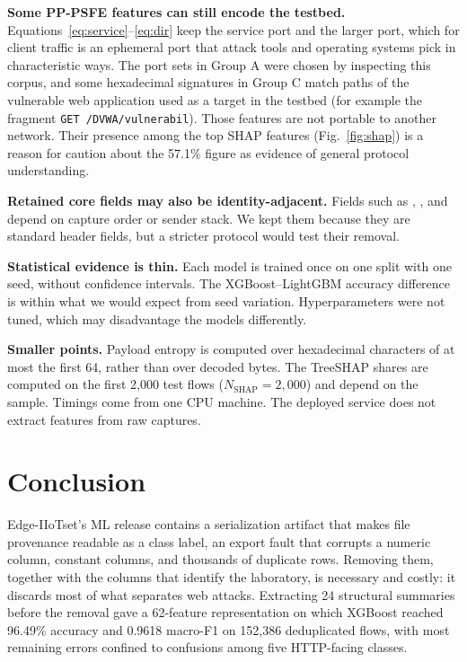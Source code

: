 \documentclass[journal]{IEEEtran}
\newcommand{\feat}[1]{\texttt{\detokenize{#1}}}
\begin{document}
\textbf{Some PP-PSFE features can still encode the testbed.} Equations~\eqref{eq:service}--\eqref{eq:dir} keep the service port and the larger port, which for client traffic is an ephemeral port that attack tools and operating systems pick in characteristic ways. The port sets in Group A were chosen by inspecting this corpus, and some hexadecimal signatures in Group C match paths of the vulnerable web application used as a target in the testbed (for example the fragment \texttt{GET /DVWA/vulnerabil}). Those features are not portable to another network. Their presence among the top SHAP features (Fig.~\ref{fig:shap}) is a reason for caution about the 57.1\% figure as evidence of general protocol understanding.

\textbf{Retained core fields may also be identity-adjacent.} Fields such as \feat{udp.stream}, \feat{tcp.seq}, \feat{tcp.ack} and \feat{icmp.seq_le} depend on capture order or sender stack. We kept them because they are standard header fields, but a stricter protocol would test their removal.

\textbf{Statistical evidence is thin.} Each model is trained once on one split with one seed, without confidence intervals. The XGBoost--LightGBM accuracy difference is within what we would expect from seed variation. Hyperparameters were not tuned, which may disadvantage the models differently.

\textbf{Smaller points.} Payload entropy is computed over hexadecimal characters of at most the first 64, rather than over decoded bytes. The TreeSHAP shares are computed on the first 2,000 test flows ($N_{\text{SHAP}}=2{,}000$) and depend on the sample. Timings come from one CPU machine. The deployed service does not extract features from raw captures.

\section{Conclusion}\label{sec:conclusion}
Edge-IIoTset's ML release contains a serialization artifact that makes file provenance readable as a class label, an export fault that corrupts a numeric column, constant columns, and thousands of duplicate rows. Removing them, together with the columns that identify the laboratory, is necessary and costly: it discards most of what separates web attacks. Extracting 24 structural summaries before the removal gave a 62-feature representation on which XGBoost reached 96.49\% accuracy and 0.9618 macro-F1 on 152,386 deduplicated flows, with most remaining errors confined to confusions among five HTTP-facing classes.
\end{document}
